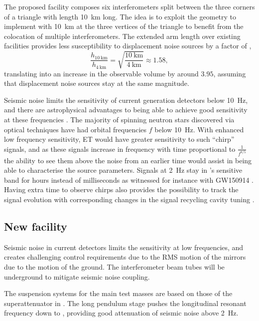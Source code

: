 The proposed \ET{} facility composes six interferometers split between the three corners of a triangle with length \SI{10}{\kilo\meter} long. The idea is to exploit the geometry to implement \MI{} with \SI{10}{\kilo\meter} at the three vertices of the triangle to benefit from the colocation of multiple interferometers. The extended arm length over existing facilities provides less susceptibility to displacement noise sources by a factor of \cite{Dwyer2015, aligocosmic2016},
\begin{equation}
  \frac{h_{\SI{10}{\kilo\meter}}}{h_{\SI{4}{\kilo\meter}}} = \sqrt{\frac{\SI{10}{\kilo\meter}}{\SI{4}{\kilo\meter}}} \approx 1.58,
\end{equation}
translating into an increase in the observable volume by around $3.95$, assuming that displacement noise sources stay at the same magnitude.

Seismic noise limits the sensitivity of current generation detectors below \SI{10}{\hertz}, and there are astrophysical advantages to being able to achieve good sensitivity at these frequencies \cite{Sathyaprakash2012}. The majority of spinning neutron stars discovered via optical techniques have had orbital frequencies $f$ below \SI{10}{\hertz}. With enhanced low frequency sensitivity, \gls{ET} would have greater sensitivity to such ``chirp'' signals, and as these signals increase in frequency with time proportional to $\frac{1}{f^{8/5}}$ the ability to see them above the noise from an earlier time would assist in being able to characterise the source parameters. Signals at \SI{2}{\hertz} stay in \ETLF{}'s sensitive band for hours instead of milliseconds as witnessed for instance with GW150914 \cite{ET2011} . Having extra time to observe chirps also provides the possibility to track the signal evolution with corresponding changes in the signal recycling cavity tuning \cite{Simakov2014}.

\subsection{New facility}
Seismic noise in current detectors limits the sensitivity at low frequencies, and creates challenging control requirements due to the \gls{RMS} motion of the mirrors due to the motion of the ground. The interferometer beam tubes will be underground  to mitigate seismic noise coupling.

The suspension systems for the main test masses are based on those of the superattenuator in \AVIRGO{}. The  long pendulum stage  pushes the longitudinal resonant frequency down to , providing good attenuation of seismic noise above \SI{2}{\hertz}.

